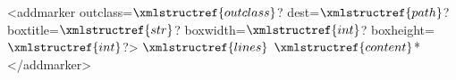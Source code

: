 <addmarker outclass=$\xmlstructref{outclass}$? dest=$\xmlstructref{path}$? boxtitle=$\xmlstructref{str}$? boxwidth=$\xmlstructref{int}$? boxheight=$\xmlstructref{int}$?>
  $\xmlstructref{lines}$
  $\xmlstructref{content}$*
</addmarker>
